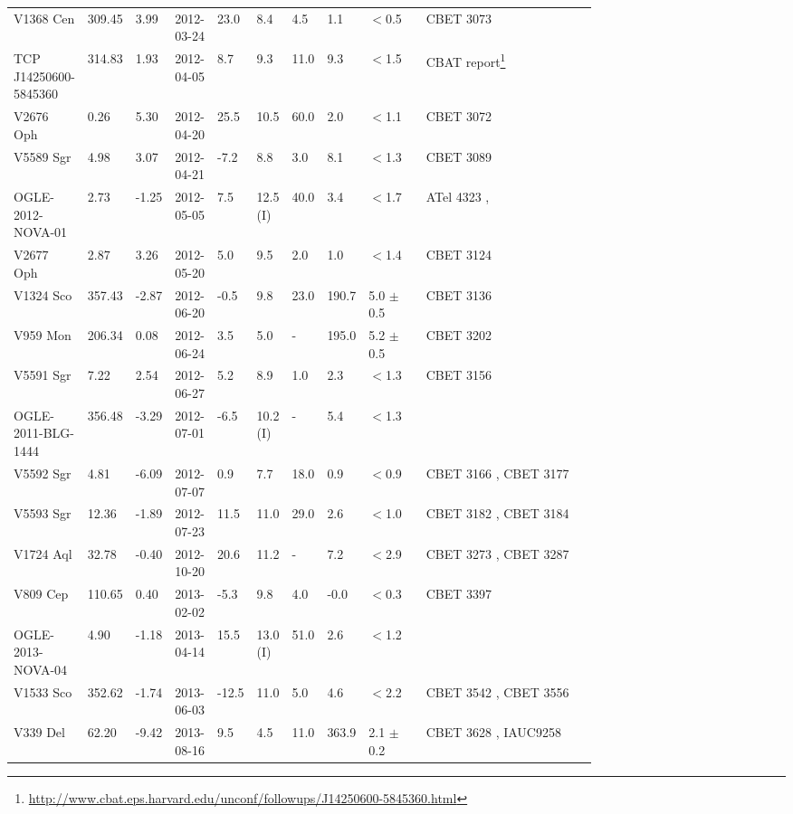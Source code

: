 \begin{landscape}
\begin{tiny}
\begin{table*}[!t]
\begin{tabular}{ L{0.07\linewidth} p{0.03\linewidth}  p{0.04\linewidth} p{0.07\linewidth} p{0.03\linewidth} p{0.04\linewidth} p{0.04\linewidth} p{0.03\linewidth} p{0.1\linewidth}  L{0.3\linewidth} }
V1368 Cen & 309.45 & 3.99 & 2012-03-24 & 23.0 & 8.4 & 4.5 & 1.1 & $<$0.5 & CBET 3073 \citep{CBET3073}\\
TCP J14250600-5845360 & 314.83 & 1.93 & 2012-04-05 & 8.7 & 9.3 & 11.0 & 9.3 & $<$1.5 & CBAT report\footnote{\url{http://www.cbat.eps.harvard.edu/unconf/followups/J14250600-5845360.html}}\\
V2676 Oph & 0.26 & 5.30 & 2012-04-20 & 25.5 & 10.5 & 60.0 & 2.0 & $<$1.1 & CBET 3072 \citep{CBET3072}\\
V5589 Sgr & 4.98 & 3.07 & 2012-04-21 & -7.2 & 8.8 & 3.0 & 8.1 & $<$1.3 & CBET 3089 \citep{CBET3089}\\
OGLE-2012-NOVA-01 & 2.73 & -1.25 & 2012-05-05 & 7.5 & 12.5 (I) & 40.0 & 3.4 & $<$1.7 & ATel 4323 \citep{ATel4323},\citep{ OGLEREF2}\\
V2677 Oph & 2.87 & 3.26 & 2012-05-20 & 5.0 & 9.5 & 2.0 & 1.0 & $<$1.4 & CBET 3124 \citep{CBET3124}\\
V1324 Sco & 357.43 & -2.87 & 2012-06-20 & -0.5 & 9.8 & 23.0 & 190.7 & 5.0 $\pm$ 0.5 & CBET 3136 \citep{CBET3136}\\
V959 Mon & 206.34 & 0.08 & 2012-06-24 & 3.5 & 5.0 & - & 195.0 & 5.2 $\pm$ 0.5 & CBET 3202 \citep{CBET3202}\\
V5591 Sgr & 7.22 & 2.54 & 2012-06-27 & 5.2 & 8.9 & 1.0 & 2.3 & $<$1.3 & CBET 3156 \citep{CBET3156}\\
OGLE-2011-BLG-1444 & 356.48 & -3.29 & 2012-07-01 & -6.5 & 10.2 (I) & - & 5.4 & $<$1.3 & \citep{OGLEREF1}\\
V5592 Sgr & 4.81 & -6.09 & 2012-07-07 & 0.9 & 7.7 & 18.0 & 0.9 & $<$0.9 & CBET 3166 \citep{CBET3166}, CBET 3177 \citep{CBET3177}\\
V5593 Sgr & 12.36 & -1.89 & 2012-07-23 & 11.5 & 11.0 & 29.0 & 2.6 & $<$1.0 & CBET 3182 \citep{CBET3182}, CBET 3184 \citep{CBET3184}\\
V1724 Aql & 32.78 & -0.40 & 2012-10-20 & 20.6 & 11.2 & - & 7.2 & $<$2.9 & CBET 3273 \citep{CBET3273}, CBET 3287 \citep{CBET3287}\\
V809 Cep & 110.65 & 0.40 & 2013-02-02 & -5.3 & 9.8 & 4.0 & -0.0 & $<$0.3 & CBET 3397 \citep{CBET3397}\\
OGLE-2013-NOVA-04 & 4.90 & -1.18 & 2013-04-14 & 15.5 & 13.0 (I) & 51.0 & 2.6 & $<$1.2 & \citep{OGLEREF2}\\
V1533 Sco & 352.62 & -1.74 & 2013-06-03 & -12.5 & 11.0 & 5.0 & 4.6 & $<$2.2 & CBET 3542 \citep{CBET3542}, CBET 3556 \citep{CBET3556}\\
V339 Del & 62.20 & -9.42 & 2013-08-16 & 9.5 & 4.5 & 11.0 & 363.9 & 2.1 $\pm$ 0.2 & CBET 3628 \citep{CBET3628}, IAUC9258 \citep{IAUC9258}\\

\end{tabular}
\end{table*}
\end{tiny}
\end{landscape}
